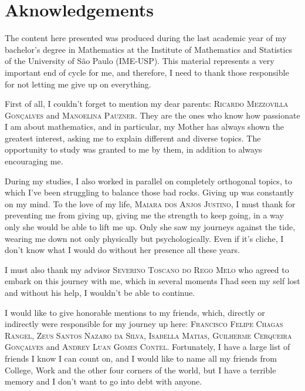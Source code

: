 \chapter*{Aknowledgements}

The content here presented was produced during the last academic year of my bachelor's degree in Mathematics at the Institute of Mathematics and Statistics of the University of São Paulo (IME-USP). This material represents a very important end of cycle for me, and therefore, I need to thank those responsible for not letting me give up on everything.

First of all, I couldn't forget to mention my dear parents: \textsc{Ricardo Mezzovilla Gonçalves} and \textsc{Manoelina Pauzner}. They are the ones who know how passionate I am about mathematics, and in particular, my Mother has always shown the greatest interest, asking me to explain different and diverse topics. The opportunity to study was granted to me by them, in addition to always encouraging me.

During my studies, I also worked in parallel on completely orthogonal topics, to which I've been struggling to balance those bad rocks. Giving up was constantly on my mind. To the love of my life, \textsc{Maiara dos Anjos Justino}, I must thank for preventing me from giving up, giving me the strength to keep going, in a way only she would be able to lift me up. Only she saw my journeys against the tide, wearing me down not only physically but psychologically. Even if it's cliche, I don't know what I would do without her presence all these years.

I must also thank my advisor \textsc{Severino Toscano do Rego Melo} who agreed to embark on this journey with me, which in several moments I'had seen my self lost and without his help, I wouldn't be able to continue.

I would like to give honorable mentions to my friends, which, directly or indirectly were responsible for my journey up here: \textsc{Francisco Felipe Chagas Rangel}, \textsc{Zeus Santos Nazaro da Silva}, \textsc{Isabella Matias}, \textsc{Guilherme Cerqueira Gonçalves} and \textsc{Andrey Luan Gomes Contel}. Fortunately, I have a large list of friends I know I can count on, and I would like to name all my friends from College, Work and the other four corners of the world, but I have a terrible memory and I don't want to go into debt with anyone.